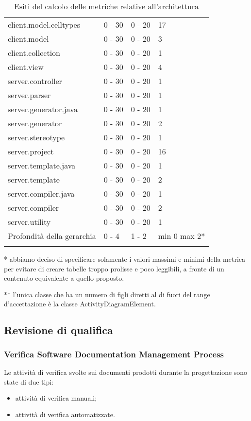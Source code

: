 \begin{longtable}{|p{5.5cm}|p{2.25cm}|p{2.25cm}|p{2.25cm}|}
		client.model.celltypes &0 - 30 &0 - 20 &17\\
		client.model &0 - 30 &0 - 20 &3\\
		client.collection &0 - 30 &0 - 20 &1\\
		client.view &0 - 30 &0 - 20 &4\\
		server.controller &0 - 30 &0 - 20 &1\\
		server.parser &0 - 30 &0 - 20 &1\\
		server.generator.java &0 - 30 &0 - 20 &1\\
		server.generator &0 - 30 &0 - 20 &2\\
		server.stereotype &0 - 30 &0 - 20 &1\\
		server.project &0 - 30 &0 - 20 &16\\
		server.template.java &0 - 30 &0 - 20 &1\\
		server.template &0 - 30 &0 - 20 &2\\
		server.compiler.java &0 - 30 &0 - 20 &1\\
		server.compiler &0 - 30 &0 - 20 &2\\
		server.utility &0 - 30 &0 - 20 &1\\
		\hline
		Profondità della gerarchia &0 - 4 &1 - 2 &min 0 max 2*\\
		\hline
		\caption{Esiti del calcolo delle metriche relative all'architettura}
		\end{longtable}
	* abbiamo deciso di specificare solamente i valori massimi e minimi della metrica per evitare di creare tabelle troppo prolisse e poco leggibili, a fronte di un contenuto equivalente a quello proposto.
	
	** l'unica classe che ha un numero di figli diretti al di fuori del range d'accettazione è la classe ActivityDiagramElement.

\subsection{Revisione di qualifica}
		\subsubsection{Verifica Software Documentation Management Process}
		Le attività di verifica svolte sui documenti prodotti durante la progettazione sono state di due tipi:
		\begin{itemize}		
			\item attività di verifica manuali;
			\item attività di verifica automatizzate.
		\end{itemize}
		
